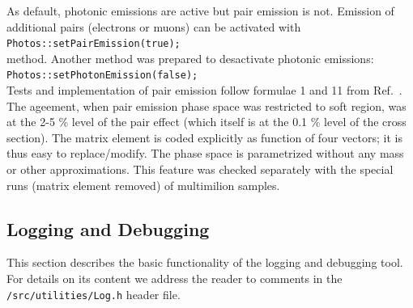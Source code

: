 \documentclass[]{Photos_interface_design}
\begin{document}
As  default, photonic emissions are active but pair emission is not.
Emission of additional pairs (electrons or muons) can be activated with
\\ {\tt Photos::setPairEmission(true); } \\
method. Another method was prepared  to desactivate photonic emissions:
\\{ \tt Photos::setPhotonEmission(false);} \\

Tests and implementation of pair emission follow formulae 1 and 11 from Ref.~\cite{Jadach:1993wk}.
The ageement, when pair emission phase space was restricted to soft region, was  at the   2-5 \% 
level of the pair effect (which itself is at the 0.1 \% level of the cross section). 
The  matrix element is coded  explicitly as function of four vectors; it is thus easy to replace/modify. 
The phase space  is parametrized without any mass or other approximations. This feature 
was checked separately with  the special runs (matrix element removed) of multimilion samples.

\subsection{Logging and Debugging}
\label{App:Logging}
This section describes the basic functionality of the logging and debugging tool.
For details on its content we address the reader to comments in the {\tt /src/utilities/Log.h} header file.
\end{document}
